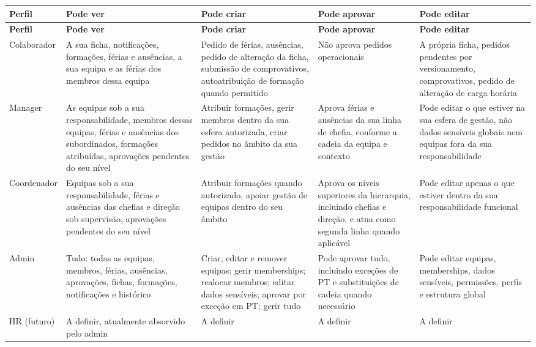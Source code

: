 \documentclass[11pt,a4paper]{article}
\begin{document}
\begin{longtable}{p{2.4cm} p{4.4cm} p{3.2cm} p{3.0cm} p{3.2cm}}
\toprule
\textbf{Perfil} & \textbf{Pode ver} & \textbf{Pode criar} & \textbf{Pode aprovar} & \textbf{Pode editar} \\
\midrule
\endfirsthead
\toprule
\textbf{Perfil} & \textbf{Pode ver} & \textbf{Pode criar} & \textbf{Pode aprovar} & \textbf{Pode editar} \\
\midrule
\endhead

Colaborador & A sua ficha, notificações, formações, férias e ausências, a sua equipa e as férias dos membros dessa equipa & Pedido de férias, ausências, pedido de alteração da ficha, submissão de comprovativos, autoatribuição de formação quando permitido & Não aprova pedidos operacionais & A própria ficha, pedidos pendentes por versionamento, comprovativos, pedido de alteração de carga horária \\

Manager & As equipas sob a sua responsabilidade, membros dessas equipas, férias e ausências dos subordinados, formações atribuídas, aprovações pendentes do seu nível & Atribuir formações, gerir membros dentro da sua esfera autorizada, criar pedidos no âmbito da sua gestão & Aprova férias e ausências da sua linha de chefia, conforme a cadeia da equipa e contexto & Pode editar o que estiver na sua esfera de gestão, não dados sensíveis globais nem equipas fora da sua responsabilidade \\

Coordenador & Equipas sob a sua responsabilidade, férias e ausências das chefias e direção sob supervisão, aprovações pendentes do seu nível & Atribuir formações quando autorizado, apoiar gestão de equipas dentro do seu âmbito & Aprova os níveis superiores da hierarquia, incluindo chefias e direção, e atua como segunda linha quando aplicável & Pode editar apenas o que estiver dentro da sua responsabilidade funcional \\

Admin & Tudo: todas as equipas, membros, férias, ausências, aprovações, fichas, formações, notificações e histórico & Criar, editar e remover equipas; gerir memberships; realocar membros; editar dados sensíveis; aprovar por exceção em PT; gerir tudo & Pode aprovar tudo, incluindo exceções de PT e substituições de cadeia quando necessário & Pode editar equipas, memberships, dados sensíveis, permissões, perfis e estrutura global \\

HR (futuro) & A definir, atualmente absorvido pelo admin & A definir & A definir & A definir \\
\bottomrule
\end{longtable}
\end{document}
